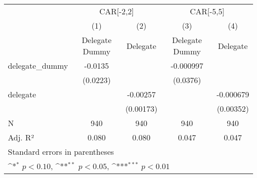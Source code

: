 {
\def\sym#1{\ifmmode^{#1}\else\(^{#1}\)\fi}
\begin{tabular}{l*{4}{c}}
\hline\hline
                    &\multicolumn{2}{c}{CAR[-2,2]}              &\multicolumn{2}{c}{CAR[-5,5]}              \\
                    &\multicolumn{1}{c}{(1)}&\multicolumn{1}{c}{(2)}&\multicolumn{1}{c}{(3)}&\multicolumn{1}{c}{(4)}\\
                    &\multicolumn{1}{c}{Delegate Dummy}&\multicolumn{1}{c}{Delegate}&\multicolumn{1}{c}{Delegate Dummy}&\multicolumn{1}{c}{Delegate}\\
\hline
delegate\_dummy      &     -0.0135         &                     &   -0.000997         &                     \\
                    &    (0.0223)         &                     &    (0.0376)         &                     \\
delegate            &                     &    -0.00257         &                     &   -0.000679         \\
                    &                     &   (0.00173)         &                     &   (0.00352)         \\
\hline
N                   &         940         &         940         &         940         &         940         \\
Adj. R²             &       0.080         &       0.080         &       0.047         &       0.047         \\
\hline\hline
\multicolumn{5}{l}{\footnotesize Standard errors in parentheses}\\
\multicolumn{5}{l}{\footnotesize \sym{*} \(p<0.10\), \sym{**} \(p<0.05\), \sym{***} \(p<0.01\)}\\
\end{tabular}
}
